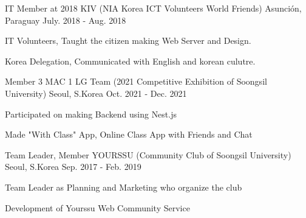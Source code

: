 

\begin{cventries}

  \cventry
    {IT Member at 2018} %
    {KIV (NIA Korea ICT Volunteers World Friends)} %
    {Asunción, Paraguay} %
    {July. 2018 - Aug. 2018} %
    {
      \begin{cvitems} %
        \item {IT Volunteers, Taught the citizen making Web Server and Design.}
        \item {Korea Delegation, Communicated with English and korean culutre.}
      \end{cvitems}
    }

  \cventry
    {Member} %
    {3 MAC 1 LG Team (2021 Competitive Exhibition of Soongsil University)} %
    {Seoul, S.Korea} %
    {Oct. 2021 - Dec. 2021} %
    {
      \begin{cvitems} %
        \item {Participated on making Backend using Nest.js}
        \item {Made "With Class" App, Online Class App with Friends and Chat}
      \end{cvitems}
    }

  \cventry
    {Team Leader, Member} %
    {YOURSSU (Community Club of Soongsil University)} %
    {Seoul, S.Korea} %
    {Sep. 2017 - Feb. 2019} %
    {
      \begin{cvitems} %
        \item {Team Leader as Planning and Marketing who organize the club}
        \item {Development of Yourssu Web Community Service }
      \end{cvitems}
    }

\end{cventries}

